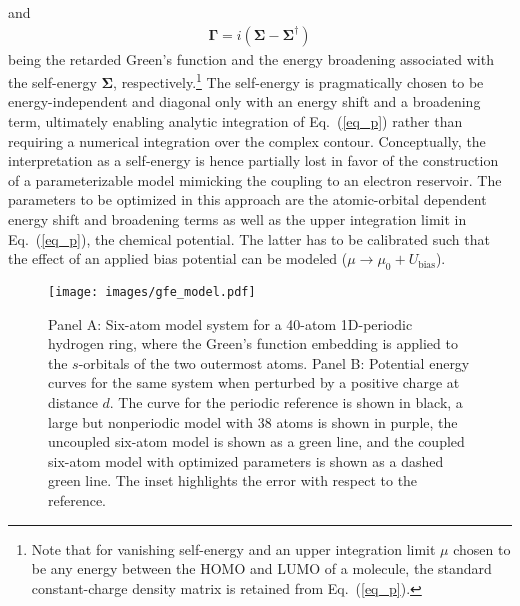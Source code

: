 \documentclass[a4paper,11pt,headings=normal]{scrartcl}
\begin{document}
and 
\begin{align}
\mathbf{\Gamma} = i (\mathbf{\Sigma} - \mathbf{\Sigma}^\dagger)
\end{align}
being the retarded Green's function\autocite{kadanoff1962,meir1992} and the 
energy broadening associated with the self-energy $\mathbf{\Sigma}$, 
respectively.\footnote{Note that for vanishing self-energy and an upper 
integration limit $\mu$ chosen to be any energy between the HOMO and LUMO of a 
molecule, the standard constant-charge density matrix is retained from 
Eq.~(\ref{eq_p}).} The self-energy is pragmatically chosen to be 
energy-independent and diagonal only with an energy shift and a 
broadening term,\autocite{arnold2007} ultimately enabling analytic integration 
of Eq.~(\ref{eq_p}) rather than requiring a numerical integration over the 
complex contour\autocite{williams1982}. Conceptually, the interpretation as a 
self-energy is hence partially lost in favor of the construction of a 
parameterizable model mimicking the coupling to an electron reservoir.
The parameters to be optimized in this approach are the 
atomic-orbital dependent energy shift and broadening terms as well as the upper 
integration limit in Eq.~(\ref{eq_p}), the chemical potential. The latter has 
to be calibrated such that the effect of an applied bias potential can be 
modeled ($\mu \rightarrow \mu_0 + U_\text{bias}$).\\
\begin{figure}[h!]
	\centering
	\vspace{-0.5em}
	\texttt{[image: images/gfe\_model.pdf]}
	\vspace{-2.5em}
	\caption{Panel A: Six-atom model system for a 40-atom 1D-periodic hydrogen 
		ring, where the Green's function embedding is applied to the $s$-orbitals of 
		the two outermost atoms. Panel B: Potential energy curves for the same system 
		when perturbed by a positive charge at distance $d$. The curve for the 
		periodic reference is shown in black, a large but nonperiodic model with 38 
		atoms is shown in purple, the uncoupled six-atom model is shown as a green 
		line, and the coupled six-atom model with optimized parameters is shown as a 
		dashed green line. The inset highlights the error with respect to the 
		reference.}  
	\label{fig:pop_gfe}
	\vspace{-1em}
\end{figure}
\end{document}

